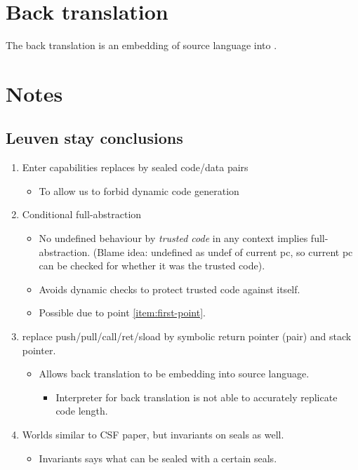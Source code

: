 \documentclass[a3paper]{article}
\begin{document}
\clearpage
\section{Back translation}
The back translation is an embedding of source language into .

\section{Notes}
\subsection{Leuven stay conclusions}
\begin{enumerate}
\item Enter capabilities replaces by sealed code/data pairs \label{item:first-point}
  \begin{itemize}
  \item To allow us to forbid dynamic code generation
  \end{itemize}
\item Conditional full-abstraction
  \begin{itemize}
  \item No undefined behaviour by \emph{trusted code} in any context implies full-abstraction. (Blame idea: undefined as undef of current pc, so current pc can be checked for whether it was the trusted code).
  \item Avoids dynamic checks to protect trusted code against itself.
  \item Possible due to point \ref{item:first-point}.
  \end{itemize}
\item replace push/pull/call/ret/sload by symbolic return pointer (pair) and stack pointer.
  \begin{itemize}
  \item Allows back translation to be embedding into source language.
    \begin{itemize}
    \item Interpreter for back translation is not able to accurately replicate code length.
    \end{itemize}
  \end{itemize}
\item Worlds similar to CSF paper, but invariants on seals as well.
  \begin{itemize}
  \item Invariants says what can be sealed with a certain seals.
  \end{itemize}

\end{enumerate}
\end{document}
